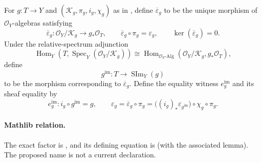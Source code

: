 \begin{definition}
  \label{def:nagata-scheme-image-factor}
  \lean{}

  For $g\colon T\to Y$ and
  $(\mathcal K_g,\pi_g,i_g,\chi_g)$ as in
  , define
  $\overline\varepsilon_g$ to be the unique morphism of
  $\mathcal O_Y$-algebras satisfying
  \[
    \overline\varepsilon_g\colon
      \mathcal O_Y/\mathcal K_g\longrightarrow g_*\mathcal O_T,
    \qquad
    \overline\varepsilon_g\circ\pi_g=\varepsilon_g,
    \qquad
    \ker(\overline\varepsilon_g)=0.
  \]
  Under the relative-spectrum adjunction
  \[
    \operatorname{Hom}_Y
      \!\left(T,\operatorname{Spec}_Y(\mathcal O_Y/\mathcal K_g)\right)
      \cong
    \operatorname{Hom}_{\mathcal O_Y\text{-Alg}}
      \!\left(\mathcal O_Y/\mathcal K_g,g_*\mathcal O_T\right),
  \]
  define
  \[
    g^{\mathrm{im}}\colon T\longrightarrow\operatorname{SIm}_Y(g)
  \]
  to be the morphism corresponding to $\overline\varepsilon_g$.  Define the
  equality witness $e_g^{\mathrm{im}}$ and its sheaf equality by
  \[
    e_g^{\mathrm{im}}\colon i_g\circ g^{\mathrm{im}}=g,
    \qquad
    \varepsilon_g
      =\overline\varepsilon_g\circ\pi_g
      =\bigl((i_g)_*\varepsilon_{g^{\mathrm{im}}}\bigr)
         \circ\chi_g\circ\pi_g.
  \]

  \paragraph{Mathlib relation.}
  The exact factor is \texttt{}, and its
  defining equation is
  \texttt{} (with the associated
  \texttt{} lemma).  The proposed name
  \texttt{} is not a current declaration.
\end{definition}

